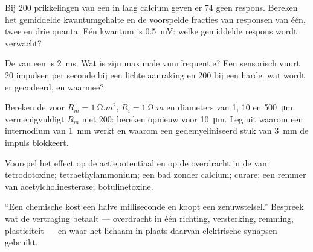 \begin{exercise}[$\star\star$]\label{exo:b2:neurons-synapses:8}
Bij 200 prikkelingen van een  in laag calcium geven er 74 geen
respons. Bereken het gemiddelde kwantumgehalte en de voorspelde fracties van
responsen van één, twee en drie quanta. Eén kwantum is \qty{0.5}{mV}:
welke gemiddelde respons wordt verwacht?
\end{exercise}

\begin{exercise}[$\star\star$]\label{exo:b2:neurons-synapses:9}
De  van een  is \qty{2}{ms}. Wat is zijn maximale
vuurfrequentie? Een sensorisch  vuurt 20 impulsen per seconde bij een
lichte aanraking en 200 bij een harde: wat wordt er gecodeerd, en waarmee?
\end{exercise}

\begin{exercise}[$\star\star\star$]\label{exo:b2:neurons-synapses:10}
Bereken de  voor $R_m = \qty{1}{\ohm.m^2}$, $R_i =
\qty{1}{\ohm.m}$ en diameters van 1, 10 en \qty{500}{\micro m}. 
vermenigvuldigt $R_m$ met 200: bereken opnieuw voor \qty{10}{\micro m}. Leg
uit waarom een internodium van \qty{1}{mm} werkt en waarom een gedemyeliniseerd
stuk van \qty{3}{mm} de impuls blokkeert.
\end{exercise}

\begin{exercise}[$\star\star\star$]\label{exo:b2:neurons-synapses:11}
Voorspel het effect op de actiepotentiaal en op de overdracht in de
 van: tetrodotoxine; tetraethylammonium; een bad
zonder calcium; curare; een remmer van acetylcholinesterase;
botulinetoxine.
\end{exercise}

\begin{exercise}[$\star\star\star$]\label{exo:b2:neurons-synapses:12}
``Een chemische  kost een halve milliseconde en koopt een
zenuwstelsel.'' Bespreek wat de vertraging betaalt --- overdracht in één
richting, versterking, remming, plasticiteit --- en waar het lichaam in
plaats daarvan elektrische synapsen gebruikt.
\end{exercise}


